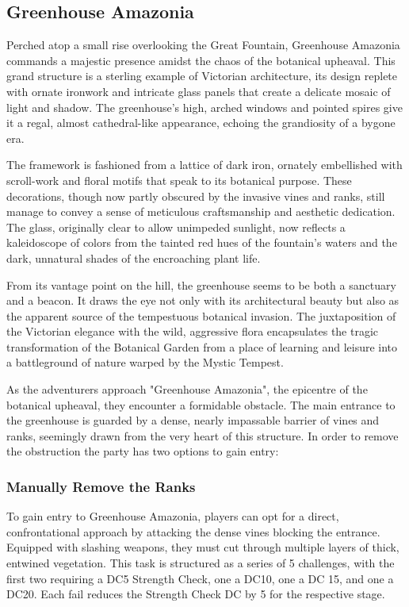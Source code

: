 \subsection*{Greenhouse Amazonia}
Perched atop a small rise overlooking the Great Fountain, Greenhouse Amazonia commands a majestic presence amidst the chaos of the botanical upheaval. This grand structure is a sterling example of Victorian architecture, its design replete with ornate ironwork and intricate glass panels that create a delicate mosaic of light and shadow. The greenhouse's high, arched windows and pointed spires give it a regal, almost cathedral-like appearance, echoing the grandiosity of a bygone era.

The framework is fashioned from a lattice of dark iron, ornately embellished with scroll-work and floral motifs that speak to its botanical purpose. These decorations, though now partly obscured by the invasive vines and ranks, still manage to convey a sense of meticulous craftsmanship and aesthetic dedication. The glass, originally clear to allow unimpeded sunlight, now reflects a kaleidoscope of colors from the tainted red hues of the fountain's waters and the dark, unnatural shades of the encroaching plant life.

From its vantage point on the hill, the greenhouse seems to be both a sanctuary and a beacon. It draws the eye not only with its architectural beauty but also as the apparent source of the tempestuous botanical invasion. The juxtaposition of the Victorian elegance with the wild, aggressive flora encapsulates the tragic transformation of the Botanical Garden from a place of learning and leisure into a battleground of nature warped by the Mystic Tempest.

As the adventurers approach "Greenhouse Amazonia", the epicentre of the botanical upheaval, they encounter a formidable obstacle. The main entrance to the greenhouse is guarded by a dense, nearly impassable barrier of vines and ranks, seemingly drawn from the very heart of this structure. In order to remove the obstruction the party has two options to gain entry:

\subsubsection*{Manually Remove the Ranks}
To gain entry to Greenhouse Amazonia, players can opt for a direct, confrontational approach by attacking the dense vines blocking the entrance. Equipped with slashing weapons, they must cut through multiple layers of thick, entwined vegetation. This task is structured as a series of 5 challenges, with the first two requiring a DC5 Strength Check, one a DC10, one a DC 15, and one a DC20. Each fail reduces the Strength Check DC by 5 for the respective stage.

